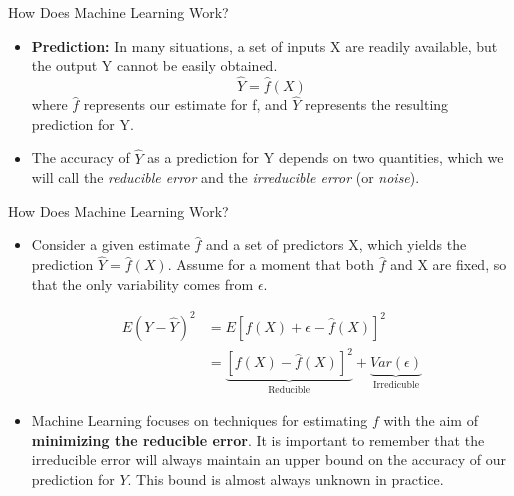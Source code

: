\documentclass[aspectratio=169,xcolor=dvipsnames]{beamer}
\begin{document}
\begin{frame}{How Does Machine Learning Work?}
\begin{itemize}
\setlength{\itemsep}{.25cm}

\item \textbf{Prediction:} In many situations, a set of inputs X are readily available, but the output Y cannot be easily obtained. $$\hat{Y} = \hat{f}(X)$$
where $\hat{f}$ represents our estimate for f, and $\hat{Y}$ represents the resulting prediction for Y.
\item The accuracy of $\hat{Y}$ as a prediction for Y depends on two quantities, which we will call the \textit{reducible error} and the \textit{irreducible error} (or \textit{noise}).
\end{itemize}

\end{frame}


\begin{frame}{How Does Machine Learning Work?}
\begin{itemize}
\setlength{\itemsep}{.25cm}

\item Consider a given estimate $\hat{f}$ and a set of predictors X, which yields the prediction $\hat{Y} = \hat{f}(X)$. Assume for a moment that both $\hat{f}$ and X are fixed, so that the only variability comes from $\epsilon$.

\begin{align*}
E(Y - \hat{Y})^2 &= E[f(X) + \epsilon - \hat{f}(X)]^2 \\
&= \underbrace{[f(X) - \hat{f}(X)]^2}_{\text{Reducible}} + \underbrace{Var(\epsilon)}_{\text{Irredicuble}}
\end{align*}

\item Machine Learning focuses on techniques for estimating $f$ with the aim of \textbf{minimizing the reducible error}. It is important to remember that the irreducible error will always maintain an upper bound on the accuracy of our prediction for $Y$. This bound is almost always unknown in practice.

\end{itemize}
\end{frame}

\end{document}
